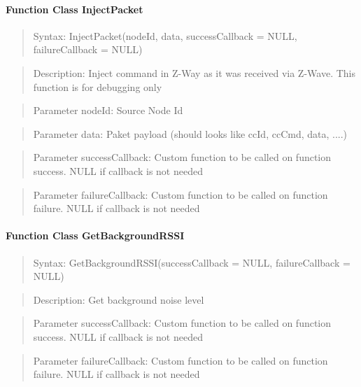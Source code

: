 \paragraph{Function Class InjectPacket}
\begin{quote}Syntax: InjectPacket(nodeId, data, successCallback = NULL, failureCallback = NULL)\end{quote}
\begin{quote}Description: Inject command in Z-Way as it was received via Z-Wave. This function is for debugging only\end{quote}
\begin{quote}Parameter nodeId: Source Node Id\end{quote}
\begin{quote}Parameter data: Paket payload (should looks like ccId, ccCmd, data, ....)\end{quote}
\begin{quote}Parameter successCallback: Custom function to be called on function success. NULL if callback is not needed\end{quote}
\begin{quote}Parameter failureCallback: Custom function to be called on function failure. NULL if callback is not needed\end{quote}


\paragraph{Function Class GetBackgroundRSSI}
\begin{quote}Syntax: GetBackgroundRSSI(successCallback = NULL, failureCallback = NULL)\end{quote}
\begin{quote}Description: Get background noise level\end{quote}
\begin{quote}Parameter successCallback: Custom function to be called on function success. NULL if callback is not needed\end{quote}
\begin{quote}Parameter failureCallback: Custom function to be called on function failure. NULL if callback is not needed\end{quote}


